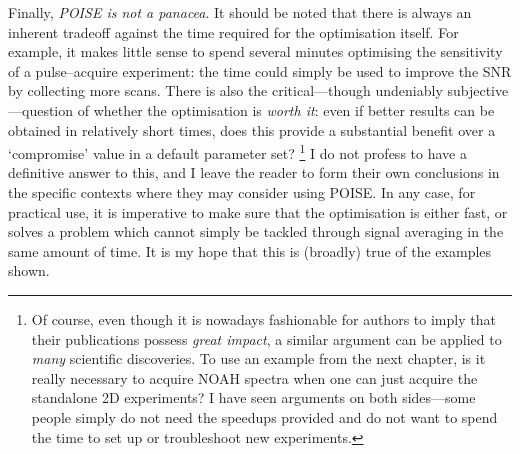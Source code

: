 Finally, \textit{POISE is not a panacea}.
It should be noted that there is always an inherent tradeoff against the time required for the optimisation itself.
For example, it makes little sense to spend several minutes optimising the sensitivity of a pulse--acquire experiment: the time could simply be used to improve the SNR by collecting more scans.
There is also the critical---though undeniably subjective---question of whether the optimisation is \textit{worth it}: even if better results can be obtained in relatively short times, does this provide a substantial benefit over a `compromise' value in a default parameter set?%
\footnote{Of course, even though it is nowadays fashionable for authors to imply that their publications possess \textit{great impact}, a similar argument can be applied to \textit{many} scientific discoveries. To use an example from the next chapter, is it really necessary to acquire NOAH spectra when one can just acquire the standalone 2D experiments? I have seen arguments on both sides---some people simply do not need the speedups provided and do not want to spend the time to set up or troubleshoot new experiments.}
I do not profess to have a definitive answer to this, and I leave the reader to form their own conclusions in the specific contexts where they may consider using POISE.
In any case, for practical use, it is imperative to make sure that the optimisation is either fast, or solves a problem which cannot simply be tackled through signal averaging in the same amount of time.
It is my hope that this is (broadly) true of the examples shown.
